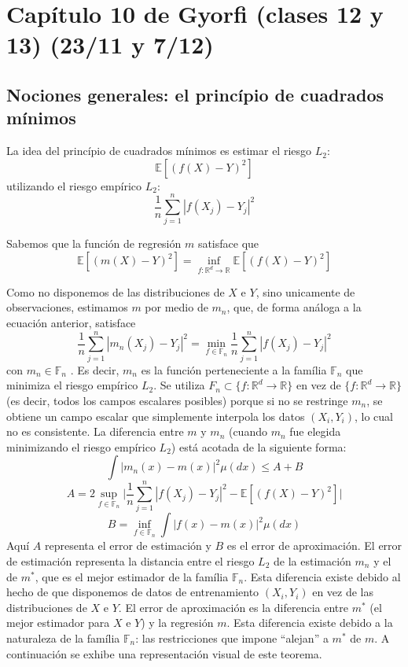 \documentclass[12pt, a4paper]{article}
\begin{document}
\section{Capítulo 10 de Gyorfi (clases 12 y 13) (23/11 y 7/12)}
\subsection{Nociones generales: el princípio de cuadrados mínimos}
La idea del princípio de cuadrados mínimos es estimar el riesgo $L_2$:
$$
\mathds{E}[(f(X)-Y)^2]
$$
utilizando el riesgo empírico $L_2$:
$$
\frac{1}{n} \sum_{j=1}^n | f(X_j) -Y_j |^2
$$

Sabemos que la función de regresión $m$ satisface que 
$$
\mathds{E}[(m(X)-Y)^2] = \mathop{inf}_{f:\mathds{R}^d \rightarrow \mathds{R}} \mathds{E}[(f(X)-Y)^2]
$$

Como no disponemos de las distribuciones de $X$ e $Y$, sino unicamente de observaciones, estimamos $m$ por medio de $m_n$, que, de forma análoga a la ecuación anterior, satisface
$$
\frac{1}{n} \sum_{j=1}^n | m_n(X_j) -Y_j |^2 
= 
\mathop{min}_{f\in\mathds{F}_n}
\frac{1}{n} \sum_{j=1}^n | f(X_j) -Y_j |^2
$$
con $m_n\in\mathds{F}_n$ . Es decir, $m_n$ es la función perteneciente a la família $\mathds{F}_n$ que minimiza el riesgo empírico $L_2$.
Se utiliza $F_n\subset \{ f:\mathds{R}^d \rightarrow \mathds{R}\}$ en vez de $\{ f:\mathds{R}^d \rightarrow \mathds{R}\}$ (es decir, todos los campos escalares posibles) porque si no se restringe $m_n$, se obtiene un campo escalar que simplemente interpola los datos $(X_i,Y_i)$, lo cual no es consistente.
La diferencia entre $m$ y $m_n$ (cuando $m_n$ fue elegida minimizando el riesgo empírico $L_2$) está acotada de la siguiente forma:
$$
\int |m_n(x)-m(x)|^2 \mu(dx) \leq A + B
$$
$$
A=2\mathop{sup}_{f\in\mathds{F}_n} \Bigg| \frac{1}{n}\sum_{j=1}^n |f(X_j)-Y_j|^2 - \mathds{E}[(f(X)-Y)^2] \Bigg|
$$
$$
B=\mathop{inf}_{f\in\mathds{F}_n} \int |f(x)-m(x)|^2 \mu(dx)
$$
Aquí $A$ representa el error de estimación y $B$ es el error de aproximación. El error de estimación representa la distancia entre el riesgo $L_2$ de la estimación $m_n$ y el de $m^{*}$, que es el mejor estimador de la família $\mathds{F}_n$. Esta diferencia existe debido al hecho de que disponemos de datos de entrenamiento $(X_i,Y_i)$ en vez de las distribuciones de $X$ e $Y$. El error de aproximación es la diferencia entre $m^{*}$ (el mejor estimador para $X$ e $Y$) y la regresión $m$. Esta diferencia existe debido a la naturaleza de la família $\mathds{F}_n$: las restricciones que impone ``alejan'' a $m^{*}$ de $m$. A continuación se exhibe una representación visual de este teorema.
\end{document}
